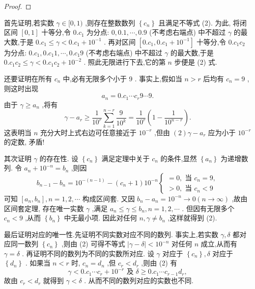 \begin{proof}

\end{proof}
首先证明,若实数 \(\gamma  \in  \lbrack 0,1)\) ,则存在整数数列 \(\left\{  {c}_{n}\right\}\) 且满足不等式 (2). 为此, 将闭区间 \(\left\lbrack  {0,1}\right\rbrack\) 十等分,令 \(0.{c}_{1}\) 为分点: \(0,{0.1},\cdots ,{0.9}\) (不考虑右端点) 中不超过 \(\gamma\) 的最大数,于是 \(0.{c}_{1} \leq  \gamma  < 0.{c}_{1} + {10}^{-1}\) . 再对区间 \(\left\lbrack  {0.{c}_{1},0.{c}_{1} + {10}^{-1}}\right\rbrack\) 十等分,令 \(0.{c}_{1}{c}_{2}\) 为分点: \(0.{c}_{1},0.{c}_{1}1,\cdots ,0.{c}_{1}9\) (不考虑右端点) 中不超过 \(\gamma\) 的最大数,于是 \(0.{c}_{1}{c}_{2} \leq  \gamma  < 0.{c}_{1}{c}_{2} + {10}^{-2}\) . 照此无限进行下去,它的第 \(n\) 步便是 (2) 式.

还要证明在所有 \({c}_{n}\) 中,必有无限多个小于 9 . 事实上,假如当 \(n > r\) 后均有 \({c}_{n} = 9\) ,则这时出现
\[
{a}_{n} = 0.{c}_{1}\cdots {c}_{r}9\cdots 9.
\]
由于 \(\gamma  \geq  {a}_{n}\) ,将有
\[
\gamma  - {a}_{r} \geq  \frac{1}{{10}^{r}}\mathop{\sum }\limits_{{k = 1}}^{{n - r}}\frac{9}{{10}^{k}} = \frac{1}{{10}^{r}}\left( {1 - \frac{1}{{10}^{n - r}}}\right) .
\]
这表明当 \(n\) 充分大时上式右边可任意接近于 \({10}^{-r}\) ,但由 \(\left( 2\right) \gamma  - {a}_{r}\) 应为小于 \({10}^{-r}\) 的定数, 矛盾!

其次证明 \(\gamma\) 的存在性. 设 \(\left\{  {c}_{n}\right\}\) 满足定理中关于 \({c}_{n}\) 的条件,显然 \(\left\{  {a}_{n}\right\}\) 为递增数列. 令 \({a}_{n} + {10}^{-n} = {b}_{n}\) ,则因
\[
{b}_{n - 1} - {b}_{n} = {10}^{-\left( {n - 1}\right) } - \left( {{c}_{n} + 1}\right) {10}^{-n}\left\{  \begin{array}{l}  = 0,\text{ 当 }{c}_{n} = 9, \\   > 0,\text{ 当 }{c}_{n} < 9 \end{array}\right.
\]
可知 \(\left\lbrack  {{a}_{n},{b}_{n}}\right\rbrack  ,n = 1,2,\cdots\) 构成区间套. 又因 \({b}_{n} - {a}_{n} = {10}^{-n} \rightarrow  0\left( {n \rightarrow  \infty }\right)\) ,故由区间套定理, 存在唯一实数 \(\gamma\) ,满足 \({a}_{n} \leq  \gamma  \leq  {b}_{n},n = 1,2,\cdots\) . 但因有无限多个 \({c}_{n} < 9\) ,从而 \(\left\{  {b}_{n}\right\}\) 中无最小项. 因此对任何 \(n,\gamma  \neq  {b}_{n}\) ,这样就得到 (2).

最后证明对应的唯一性.先证明不同实数对应不同的数列. 事实上,若实数 \(\gamma ,\delta\) 都对应同一数列 \(\left\{  {c}_{n}\right\}\) ,则由 (2) 可得不等式 \(\left| {\gamma  - \delta }\right|  < {10}^{-n}\) 对任何 \(n\) 成立,从而有 \(\gamma  = \delta\) . 再证明不同的数列为不同的实数所对应. 设 \(\gamma\) 对应于 \(\left\{  {c}_{n}\right\}  ,\delta\) 对应于 \(\left\{  {d}_{n}\right\}\) . 如果当 \(n < r\) 时, \({c}_{n} = {d}_{n}\) ,但 \({c}_{r} < {d}_{r}\) ,则由 (2) 有
\[
\gamma  < 0.{c}_{1}\cdots {c}_{r} + {10}^{-r}\text{ 及 }\delta  \geq  0.{c}_{1}\cdots {c}_{r - 1}{d}_{r},
\]
故由 \({c}_{r} < {d}_{r}\) 就得到 \(\gamma  < \delta\) . 从而不同的数列对应的实数也不同.

